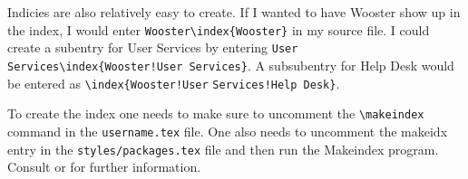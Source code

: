 Indicies are also relatively easy to create. If I wanted to have Wooster show up in the index, I would enter \verb|Wooster\index{Wooster}| in my source file. I could create a subentry for User Services by entering \verb|User Services|\verb|\index{Wooster!User Services}|. A subsubentry for Help Desk would be entered as \verb|\index{Wooster!User| \verb|Services!Help Desk}|.

To create the index one needs to make sure to uncomment the \verb|\makeindex| command in the \texttt{username.tex} file. One also needs to uncomment the makeidx entry in the \verb|styles/packages.tex| file and then run the Makeindex program. Consult \citet{kd03} or \citet{mgbcr04} for further information.
